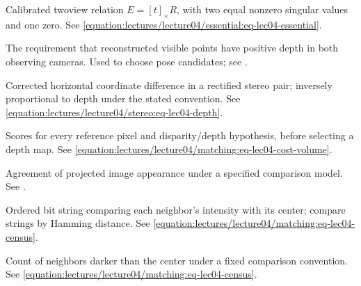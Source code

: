 \documentclass[letterpaper,11pt,english,openany,oneside]{jupyterBook}
\begin{document}
\begin{description}
\sphinxAtStartPar
Calibrated two\sphinxhyphen{}view relation \(E=[t]_\times R\), with two equal nonzero singular values and one zero. See \eqref{equation:lectures/lecture04/essential:eq-lec04-essential}.

\sphinxAtStartPar
The requirement that reconstructed visible points have positive depth in both observing cameras. Used to choose pose candidates; see {\hyperref[\detokenize{lectures/lecture04/essential:lec04-essential}]{}}.

\sphinxAtStartPar
Corrected horizontal coordinate difference in a rectified stereo pair; inversely proportional to depth under the stated convention. See \eqref{equation:lectures/lecture04/stereo:eq-lec04-depth}.

\sphinxAtStartPar
Scores for every reference pixel and disparity/depth hypothesis, before selecting a depth map. See \eqref{equation:lectures/lecture04/matching:eq-lec04-cost-volume}.

\sphinxAtStartPar
Agreement of projected image appearance under a specified comparison model. See {\hyperref[\detokenize{lectures/lecture04/matching:lec04-matching}]{}}.

\sphinxAtStartPar
Ordered bit string comparing each neighbor’s intensity with its center; compare strings by Hamming distance. See \eqref{equation:lectures/lecture04/matching:eq-lec04-census}.

\sphinxAtStartPar
Count of neighbors darker than the center under a fixed comparison convention. See \eqref{equation:lectures/lecture04/matching:eq-lec04-census}.


\end{description}
\end{document}
